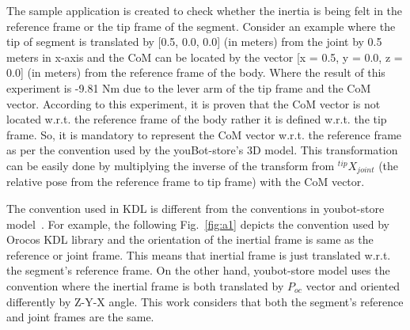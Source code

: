 The sample application is created to check whether the inertia is being felt in the reference frame or the tip frame of the segment. Consider an example where the tip of segment is translated by [0.5, 0.0, 0.0] (in meters) from the joint by 0.5 meters in x-axis and the CoM can be located by the vector [x = 0.5, y = 0.0, z = 0.0] (in meters) from the reference frame of the body. Where the result of this experiment is -9.81 Nm due to the lever arm of the tip frame and the CoM vector. According to this experiment, it is proven that the CoM vector is not located w.r.t. the reference frame of the body rather it is defined w.r.t. the tip frame. So, it is mandatory to represent the CoM vector w.r.t. the reference frame as per the convention used by the youBot-store's 3D model. This transformation can be easily done by multiplying the inverse of the transform from $^{tip}X_{joint}$ (the relative pose from the reference frame to tip frame) with the CoM vector.

The convention used in KDL is different from the conventions in youbot-store model~\cite{kukamanipulator}. For example, the following Fig.~\ref{fig:a1} depicts the convention used by Orocos KDL library and the orientation of the inertial frame is same as the reference or joint frame. This means that inertial frame is just translated w.r.t. the segment's reference frame. On the other hand, youbot-store model uses the convention where the inertial frame is both translated by $P_{oc}$ vector and oriented differently by Z-Y-X angle. This work considers that both the segment's reference and joint frames are the same.

